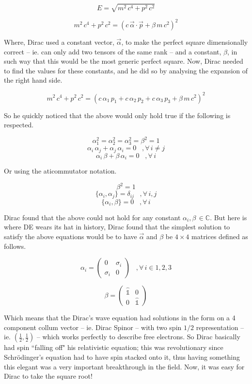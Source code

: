 \documentclass[a4page,12pt]{article}
\newcommand{\eqL}[2]{
	\begin{equation} \label{#1}
		#2
	\end{equation}
}
\begin{document}
		\[
			E = \sqrt{m^2 \, c^4 + p^2 \, c^2}
		\]

		\[
			m^2\,c^4 + p^2 \, c^2 = \left( c \,\vec{\alpha}\cdot \vec{p} + \beta\,m\,c^2 \right)^2
		\]

	Where, Dirac used a constant vector, $\vec{\alpha}$, to make the perfect square dimensionally correct -- ie. can only add two tensors of the same rank -- and a constant, $\beta$, in such way that this would be the most generic perfect square. Now, Dirac needed to find the values for these constants, and he did so by analysing the expansion of the right hand side.

		\[
			m^2\,c^4 + p^2 \, c^2 = \left( c \,\alpha_1\, p_1 +  c \,\alpha_2\, p_2+  c \,\alpha_3\, p_3 + \beta\,m\,c^2 \right)^2
		\]

	So he quickly noticed that the above would only hold true if the following is respected.

		\[
			\alpha_1^2 = \alpha_2^2 = \alpha_3^2 = \beta^2 = 1
		\]
		\[
			\alpha_i \, \alpha_j + \alpha_j \, \alpha_i = 0 \;\;\; ,\forall \, i \neq j
		\]
		\[
			\alpha_i \, \beta + \beta \, \alpha_i = 0 \;\;\; ,\forall \, i 
		\]

	Or using the aticommutator notation.
		
		\[
			\beta^2 = 1
		\]
		\[
			\{\alpha_i, \alpha_j\} = \delta_{i j} \;\;\; ,\forall \, i, j
		\]
		\[
			\{\alpha_i, \beta\} = 0 \;\;\; ,\forall \, i
		\]
 	
	Dirac found that the above could not hold for any constant $\alpha_i, \beta \, \in  \mathbb {C}$. But here is where DE wears its hat in history, Dirac found that the simplest solution to satisfy the above equations would be to have $\vec{\alpha}$ and $\beta$ be $4\times 4$ matrices defined as follows.

		\eqL{alpha}{
			\alpha_i = 
			\begin{pmatrix}
				0 & \sigma_i\\
				\sigma_i & 0
			\end{pmatrix}
			\;\;\; , \forall \, i \in {1,2,3}
		}
		\eqL{beta}{
			\beta = 
			\begin{pmatrix}
				\hat{\mathbb{1}} & 0\\
				0 & \hat{\mathbb{1}}
			\end{pmatrix}
		}

	Which means that the Dirac's wave equation had solutions in the form on a 4 component collum vector -- ie. Dirac Spinor -- with two spin $1/2$ representation -- ie. $\left(\frac{1}{2},\frac{1}{2}\right)$ -- which works perfectly to describe free electrons. So Dirac basically had spin ``falling off" his relativistic equation; this was revolutionary since Schrödinger's equation had to have spin stacked onto it, thus having something this elegant was a very important breakthrough in the field. Now, it was easy for Dirac to take the square root!
\end{document}
